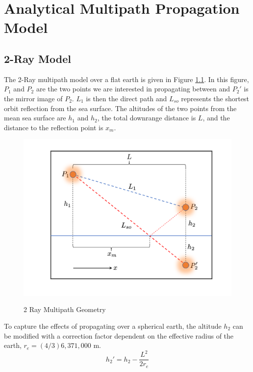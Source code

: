 \chapter{Analytical Multipath Propagation Model}
\label{analytical_propagation}

\section{2-Ray Model}
The 2-Ray multipath model over a flat earth is given in Figure \ref{mp_fig:1}. In this figure, $P_1$ and $P_2$ are the two points we are interested in propagating between and $P_2'$ is the mirror image of $P_2$. $L_1$ is then the direct path and $L_{so}$ represents the shortest orbit reflection from the sea surface. The altitudes of the two points from the mean sea surface are $h_1$ and $h_2$, the total downrange distance is $L$, and the distance to the reflection point is $x_m$.

\begin{figure}[H]
  \begin{center}
\includegraphics[width=5in]{../media/analysis/multipath_2_ray.png}
  \end{center}
  \renewcommand{\baselinestretch}{1} \small\normalsize
  \begin{quote}
    \caption[2 Ray Multipath Geometry]{ 2 Ray Multipath Geometry\label{mp_fig:1}}
  \end{quote}
\end{figure}
\renewcommand{\baselinestretch}{2} \small\normalsize

To capture the effects of propagating over a spherical earth, the altitude $h_2$ can be modified with a correction factor \cite{blake_radar} dependent on the effective radius of the earth, $r_e = (4/3) 6,371,000$ m.
\begin{equation}
h_2' = h_2 - \frac{L^2}{2r_e}
\label{mp_eq:0}
\end{equation}

